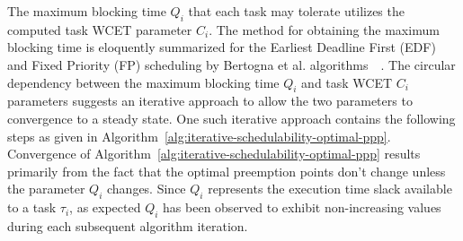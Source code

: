 The maximum blocking time \begin{math}Q_{i}\end{math} that each task may tolerate utilizes the computed task WCET parameter \begin{math}C_{i}\end{math}.  The method for obtaining the maximum blocking time is eloquently summarized for the Earliest Deadline First (EDF) and Fixed Priority (FP) scheduling by Bertogna et al. algorithms~\cite{bertogna:11}~\cite{bertogna:10}.  The circular dependency between the maximum blocking time \begin{math}Q_{i}\end{math} and task WCET \begin{math}C_{i}\end{math} parameters suggests an iterative approach to allow the two parameters to convergence to a steady state.  One such iterative approach contains the following steps as given in Algorithm~\ref{alg:iterative-schedulability-optimal-ppp}. Convergence of Algorithm~\ref{alg:iterative-schedulability-optimal-ppp} results primarily from the fact that the optimal preemption points don't change unless the parameter $Q_i$ changes.  Since $Q_i$ represents the execution time slack available to a task $\tau_i$, as expected $Q_i$ has been observed to exhibit non-increasing values during each subsequent algorithm iteration.
%
